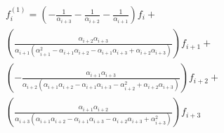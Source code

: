 \begin{multline} 
\begin{aligned} 
f^{{(1)}}_{i} = \left(- \frac{1}{\alpha_{{i+3}}} - \frac{1}{\alpha_{{i+2}}} - \frac{1}{\alpha_{{i+1}}}\right)f_{i}+ \\ \left(\frac{\alpha_{{i+2}} \alpha_{{i+3}}}{\alpha_{{i+1}} \left(\alpha_{{i+1}}^{2} - \alpha_{{i+1}} \alpha_{{i+2}} - \alpha_{{i+1}} \alpha_{{i+3}} + \alpha_{{i+2}} \alpha_{{i+3}}\right)}\right)f_{{i+1}}+ \\ \left(- \frac{\alpha_{{i+1}} \alpha_{{i+3}}}{\alpha_{{i+2}} \left(\alpha_{{i+1}} \alpha_{{i+2}} - \alpha_{{i+1}} \alpha_{{i+3}} - \alpha_{{i+2}}^{2} + \alpha_{{i+2}} \alpha_{{i+3}}\right)}\right)f_{{i+2}}+ \\ \left(\frac{\alpha_{{i+1}} \alpha_{{i+2}}}{\alpha_{{i+3}} \left(\alpha_{{i+1}} \alpha_{{i+2}} - \alpha_{{i+1}} \alpha_{{i+3}} - \alpha_{{i+2}} \alpha_{{i+3}} + \alpha_{{i+3}}^{2}\right)}\right)f_{{i+3}}
 \end{aligned}
 \end{multline} 

